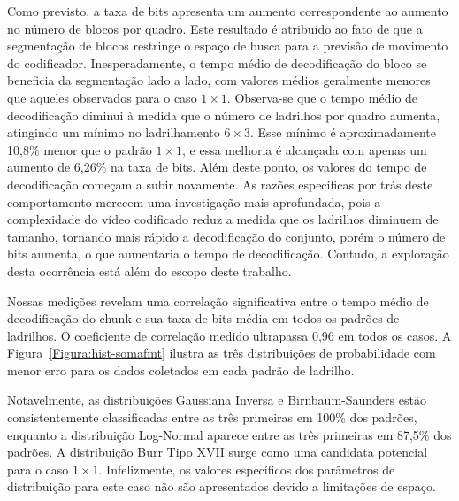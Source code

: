 Como previsto, a taxa de bits apresenta um aumento correspondente ao aumento no número de blocos por quadro. Este resultado é atribuído ao fato de que a segmentação de blocos restringe o espaço de busca para a previsão de movimento do codificador. Inesperadamente, o tempo médio de decodificação do bloco se beneficia da segmentação lado a lado, com valores médios geralmente menores que aqueles observados para o caso $1 \times 1$. Observa-se que o tempo médio de decodificação diminui à medida que o número de ladrilhos por quadro aumenta, atingindo um mínimo no ladrilhamento $6 \times 3$. Esse mínimo é aproximadamente 10,8\% menor que o padrão $1 \times 1$, e essa melhoria é alcançada com apenas um aumento de 6,26\% na taxa de bits. Além deste ponto, os valores do tempo de decodificação começam a subir novamente. As razões específicas por trás deste comportamento merecem uma investigação mais aprofundada, pois a complexidade do vídeo codificado reduz a medida que os ladrilhos diminuem de tamanho, tornando mais rápido a decodificação do conjunto, porém o número de bits aumenta, o que aumentaria o tempo de decodificação. Contudo, a exploração desta ocorrência está além do escopo deste trabalho.


Nossas medições revelam uma correlação significativa entre o tempo médio de decodificação do chunk e sua taxa de bits média em todos os padrões de ladrilhos. O coeficiente de correlação medido ultrapassa 0,96 em todos os casos. A Figura~\ref{Figura:hist-somafmt} ilustra as três distribuições de probabilidade com menor erro para os dados coletados em cada padrão de ladrilho.

Notavelmente, as distribuições Gaussiana Inversa e Birnbaum-Saunders estão consistentemente classificadas entre as três primeiras em 100\% dos padrões, enquanto a distribuição Log-Normal aparece entre as três primeiras em 87,5\% dos padrões. A distribuição Burr Tipo XVII surge como uma candidata potencial para o caso $1 \times 1$. Infelizmente, os valores específicos dos parâmetros de distribuição para este caso não são apresentados devido a limitações de espaço.



